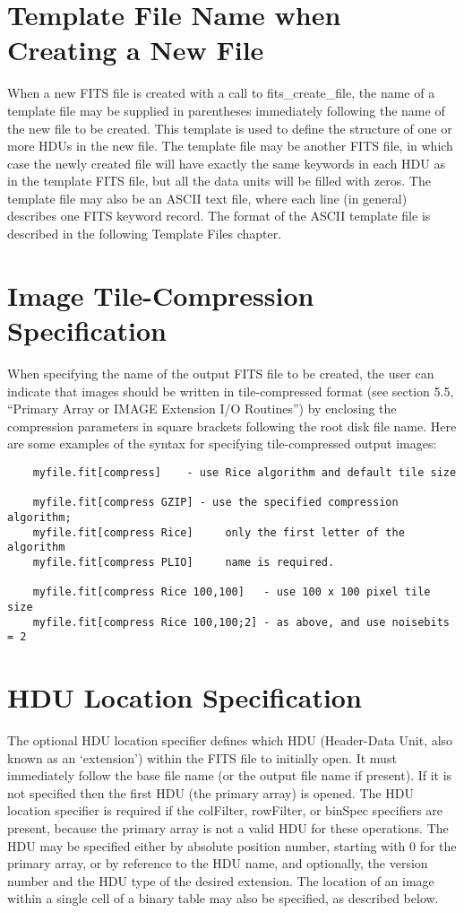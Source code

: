 \documentclass[11pt]{book}
\begin{document}
\section{Template File Name when Creating a New File}

When a new FITS file is created with a call to fits\_create\_file, the
name of a template file may be supplied in parentheses immediately
following the name of the new file to be created.  This template is
used to define the structure of one or more HDUs in the new file.  The
template file may be another FITS file, in which case the newly created
file will have exactly the same keywords in each HDU as in the template
FITS file, but all the data units will be filled with zeros.  The
template file may also be an ASCII text file, where each line (in
general) describes one FITS keyword record.  The format of the ASCII
template file is described in the following Template Files chapter.


\section{Image Tile-Compression Specification}

When specifying the name of the output FITS file to be created, the
user can indicate that images should be written in tile-compressed
format (see section 5.5, ``Primary Array or IMAGE Extension I/O
Routines'') by enclosing the compression parameters in square brackets
following the root disk file name.  Here are some examples of the
syntax for specifying tile-compressed output images:

\begin{verbatim}
    myfile.fit[compress]    - use Rice algorithm and default tile size

    myfile.fit[compress GZIP] - use the specified compression algorithm;
    myfile.fit[compress Rice]     only the first letter of the algorithm
    myfile.fit[compress PLIO]     name is required.

    myfile.fit[compress Rice 100,100]   - use 100 x 100 pixel tile size
    myfile.fit[compress Rice 100,100;2] - as above, and use noisebits = 2
\end{verbatim}


\section{HDU Location Specification}

The optional HDU location specifier defines which HDU (Header-Data
Unit, also known as an `extension') within the FITS file to initially
open.  It must immediately follow the base file name (or the output
file name if present).  If it is not specified then the first HDU (the
primary array) is opened.  The HDU location specifier is required if
the colFilter, rowFilter, or binSpec specifiers are present, because
the primary array is not a valid HDU for these operations. The HDU may
be specified either by absolute position number, starting with 0 for
the primary array, or by reference to the HDU name, and optionally, the
version number and the HDU type of the desired extension.  The location
of an image within a single cell of a binary table may also be
specified, as described below.
\end{document}

